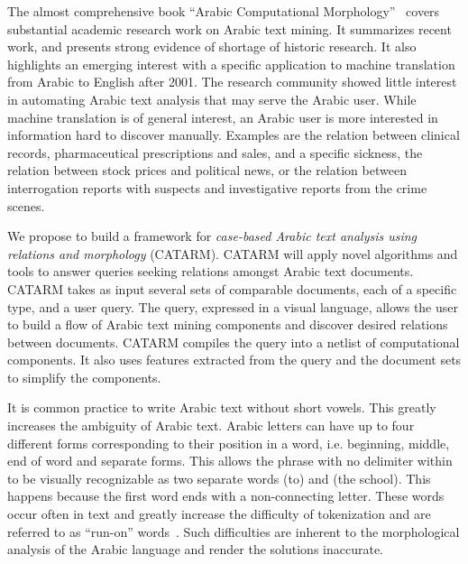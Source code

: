 \documentclass[12pt]{article}
\newcommand{\noTrRL}[1]{\transfalse\RL{#1}\transtrue}
\begin{document}
The almost comprehensive book 
``Arabic Computational Morphology''~\cite{Sou07}
covers substantial academic research work on Arabic text mining.
It summarizes recent work, and presents strong evidence of 
shortage of historic research. It also highlights  an emerging 
interest with a specific application to machine 
translation from Arabic to English after 2001.
The research community showed little interest in 
automating Arabic text analysis that may serve
the Arabic user.
While machine translation is of general interest, 
an Arabic user is more interested in 
information hard to discover manually.
Examples are the relation between clinical records, pharmaceutical 
prescriptions and sales, and a specific sickness,
the relation
between stock prices and political news, or the 
relation between interrogation reports with suspects
and investigative reports from the crime scenes. 

We propose to build a framework for
{\em case-based Arabic text analysis using relations and morphology} (CATARM). 
CATARM will apply novel algorithms and tools
to answer queries seeking relations amongst
Arabic text documents.
CATARM takes as input several sets of comparable documents, 
each of a specific
type, and a user query. %
The query, expressed in a visual language, allows the user 
to build a flow of Arabic text mining
components and discover desired relations between documents. 
CATARM compiles the query into a netlist of computational 
components. It also uses features extracted from the query and 
the document sets to simplify the %
components. 

\novocalize
It is common practice to write Arabic text
without short vowels. 
This greatly increases the ambiguity of Arabic text. 
Arabic letters can have up to 
four different forms
corresponding to their position in a word, i.e. beginning,
middle, end of word and separate forms. 
This allows the phrase
\noTrRL{il_A\nospace almdrsT}  with no delimiter within
to be visually recognizable
as two separate words  (to) and  (the school).
This happens because the first word  ends with
 a non-connecting letter. 
These words occur often in text and greatly increase the
difficulty of tokenization and are referred to as 
``run-on'' words~\cite{Buckwalter:04}.
Such difficulties are inherent to the 
morphological analysis of the Arabic language and
render the solutions inaccurate.
\end{document}
